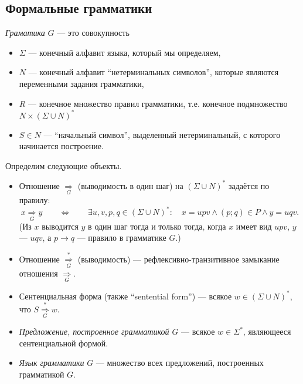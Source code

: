 \documentclass[12pt,a4paper]{article}
\begin{document}
    \subsection{Формальные грамматики}

    \begin{definition}
        \emph{Граматика} $G$ --- это совокупность
        \begin{itemize}
            \item $\Sigma$ --- конечный алфавит языка, который мы определяем,
            \item $N$ --- конечный алфавит ``нетерминальных символов'', которые являются переменными задания грамматики,
            \item $R$ --- конечное множество правил грамматики, т.е. конечное подмножество $N \times (\Sigma \cup N)^*$
            \item $S \in N$ --- ``начальный символ'', выделенный нетерминальный, с которого начинается построение.
        \end{itemize}
        
        Определим следующие объекты.
        \begin{itemize}
            \item Отношение $\mathrel{\underset{G}{\Rightarrow}}$ (выводимость в один шаг) на $(\Sigma \cup N)^*$ задаётся по правилу:
                \[
                    x \mathrel{\underset{G}{\Rightarrow}} y
                    \qquad \Longleftrightarrow \qquad
                    \exists u, v, p, q \in (\Sigma \cup N)^* \colon \quad x = upv \wedge (p; q) \in P \wedge y = uqv.
                \]
                (Из $x$ выводится $y$ в один шаг тогда и только тогда, когда $x$ имеет вид $upv$, $y$ --- $uqv$, а $p \to q$ --- правило в грамматике $G$.)
            \item Отношение $\mathrel{\overset{*}{\underset{G}{\Rightarrow}}}$ (выводимость) --- рефлексивно-транзитивное замыкание отношения $\mathrel{\underset{G}{\Rightarrow}}$.
            \item Сентенциальная форма (также ``sentential form'') --- всякое $w \in (\Sigma \cup N)^*$, что $S \mathrel{\overset{*}{\underset{G}{\Rightarrow}}} w$.
            \item \emph{Предложение, построенное грамматикой $G$} --- всякое $w \in \Sigma^*$, являющееся сентенциальной формой.
            \item \emph{Язык грамматики} $G$ --- множество всех предложений, построенных грамматикой $G$.
        \end{itemize}
    \end{definition}
\end{document}
